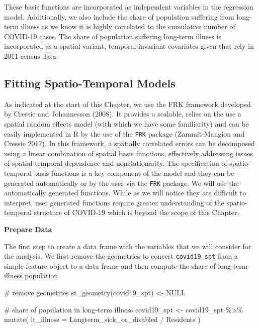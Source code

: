 \documentclass[
  letterpaper,
  krantz2]{style/krantz}
\newenvironment{Shaded}{\begin{snugshade}}{\end{snugshade}}
\newcommand{\AttributeTok}[1]{\textcolor[rgb]{0.40,0.45,0.13}{#1}}
\newcommand{\CommentTok}[1]{\textcolor[rgb]{0.37,0.37,0.37}{#1}}
\newcommand{\ConstantTok}[1]{\textcolor[rgb]{0.56,0.35,0.01}{#1}}
\newcommand{\FunctionTok}[1]{\textcolor[rgb]{0.28,0.35,0.67}{#1}}
\newcommand{\NormalTok}[1]{\textcolor[rgb]{0.00,0.23,0.31}{#1}}
\newcommand{\OtherTok}[1]{\textcolor[rgb]{0.00,0.23,0.31}{#1}}
\newcommand{\SpecialCharTok}[1]{\textcolor[rgb]{0.37,0.37,0.37}{#1}}
\begin{document}
These basis functions are incorporated as independent variables in the
regression model. Additionally, we also include the share of population
suffering from long-term illness as we know it is highly correlated to
the cumulative number of COVID-19 cases. The share of population
suffering long-term illness is incorporated as a spatial-variant,
temporal-invariant covariates given that rely in 2011 census data.

\hypertarget{fitting-spatio-temporal-models}{%
\subsection{Fitting Spatio-Temporal
Models}\label{fitting-spatio-temporal-models}}

As indicated at the start of this Chapter, we use the FRK framework
developed by Cressie and Johannesson (2008). It provides a scalable,
relies on the use a spatial random effects model (with which we have
some familiarity) and can be easily implemented in R by the use of the
\texttt{FRK} package (Zammit-Mangion and Cressie 2017). In this
framework, a spatially correlated errors can be decomposed using a
linear combination of spatial basis functions, effectively addressing
issues of spatial-temporal dependence and nonstationarity. The
specification of spatio-temporal basis functions is a key component of
the model and they can be generated automatically or by the user via the
\texttt{FRK} package. We will use the automatically generated functions.
While as we will notice they are difficult to interpret, user generated
functions require greater understanding of the spatio-temporal structure
of COVID-19 which is beyond the scope of this Chapter.

\textbf{Prepare Data}

The first step to create a data frame with the variables that we will
consider for the analysis. We first remove the geometries to convert
\texttt{covid19\_spt} from a simple feature object to a data frame and
then compute the share of long-term illness population.

\begin{Shaded}
\begin{Highlighting}[]
\CommentTok{\# remove geometries}
\FunctionTok{st\_geometry}\NormalTok{(covid19\_spt) }\OtherTok{\textless{}{-}} \ConstantTok{NULL}

\CommentTok{\# share of population in long{-}term illness }
\NormalTok{covid19\_spt }\OtherTok{\textless{}{-}}\NormalTok{ covid19\_spt }\SpecialCharTok{\%\textgreater{}\%} \FunctionTok{mutate}\NormalTok{(}
 \AttributeTok{lt\_illness =}\NormalTok{ Longterm\_sick\_or\_disabled }\SpecialCharTok{/}\NormalTok{ Residents}
\NormalTok{)}
\end{Highlighting}
\end{Shaded}
\end{document}
